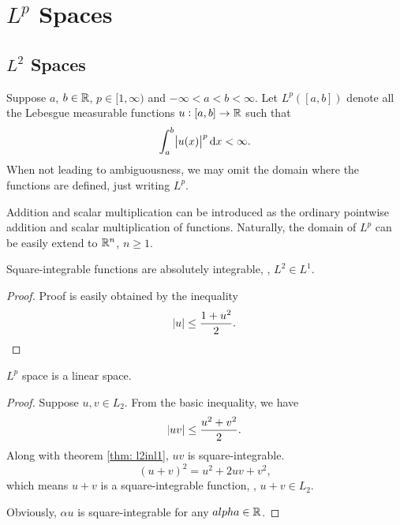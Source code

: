 \chapter{$L^p$ Spaces}
\label{chp:lp_spaces}
\section{$L^2$ Spaces}
\begin{defn}[$L^p$ space]
Suppose $a$, $b \in \mathbb{R}$, $p \in [1, \infty)$ and $-\infty < a < b < \infty$. 
Let $L^p([a, b])$ denote all the Lebesgue measurable functions 
$u: [a,b] \to \mathbb{R}$ such that 
\begin{equation}
    \int _a ^b \abs{u(x)} ^p \mathop{}\!\mathrm{d} x < \infty.
\end{equation}
When not leading to ambiguousness, we may omit the domain where the 
functions are defined, just writing $L^p$.
\end{defn}

Addition and scalar multiplication can be introduced as the ordinary 
pointwise addition and scalar multiplication of functions. 
Naturally, the domain of $L^p$ can be easily extend to $\mathbb{R} ^n$, $n \ge 1$.

\begin{thm}
\label{thm: l2inl1}
Square-integrable functions are absolutely integrable, \ie, $L^2 \in L^1$.
\end{thm}
\begin{proof}
Proof is easily obtained by the inequality
\begin{equation}
    \abs{u} \le \frac{1 + u^2}{2}.
\end{equation}
\end{proof}
\begin{thm}
    $L^p$ space is a linear space.
\end{thm}
\begin{proof}
Suppose $u, v \in L_2$. From the basic inequality, we have 
\begin{equation}
    \abs{uv} \le \frac{u^2 + v^2}{2}.
\end{equation}
Along with theorem \ref{thm: l2inl1}, $uv$ is square-integrable.
\begin{equation}
    (u + v) ^2 = u ^2 + 2uv + v^2, 
\end{equation}
which means $u+v$ is a square-integrable function, \ie, $u + v \in L_2$.

Obviously, $\alpha u$ is square-integrable for any $alpha \in \mathbb{R}$.
\end{proof}

